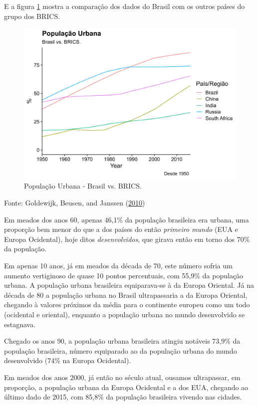 \documentclass[
	12pt,				%
	oneside,			%
	a4paper,			%
	chapter=TITLE,		%
	section=TITLE,		%
	english,			%
	brazil				%
	]{abntex2}
\newcommand{\bcenter}{\begin{center}}
\newcommand{\ecenter}{\end{center}}
\begin{document}
E a figura \ref{fig:pop-urb-brazil-brics} mostra a comparação dos dados do
Brasil com os outros países do grupo dos BRICS.
\begin{figure}[H]

{\centering \includegraphics[width=0.8\linewidth]{images/pop-urb-brazil-brics-1} 

}

\caption{População Urbana - Brasil vs. BRICS.}\label{fig:pop-urb-brazil-brics}
\end{figure}
\bcenter

Fonte: Goldewijk, Beusen, and Janssen (\protect\hyperlink{ref-doi:10.1177ux2f0959683609356587}{2010})
\ecenter

Em meados dos anos 60, apenas 46,1\% da população brasileira era urbana, uma
proporção bem menor do que a dos países do então \emph{primeiro mundo} (EUA e Europa
Ocidental), hoje ditos \emph{desenvolvidos}, que girava então em torno dos 70\% da
população.

Em apenas 10 anos, já em meados da década de 70, este número sofria um aumento
vertiginoso de quase 10 pontos percentuais, com 55,9\% da população urbana. A
população urbana brasileira equiparava-se à da Europa Oriental.
Já na década de 80 a população urbana no Brasil ultrapassaria a da Europa
Oriental, chegando à valores próximos da média para o continente europeu como um
todo (ocidental e oriental), enquanto a população urbana no mundo desenvolvido
se estagnava.

Chegado os anos 90, a população urbana brasileira atingiu notáveis 73,9\% da
população brasileira, número equiparado ao da população urbana do mundo
desenvolvido (74\% na Europa Ocidental).

Em meados dos anos 2000, já então no século atual, ousamos ultrapassar, em
proporção, a população urbana da Europa Ocidental e a dos EUA, chegando ao
último dado de 2015, com 85,8\% da população brasileira vivendo nas cidades.
\end{document}

